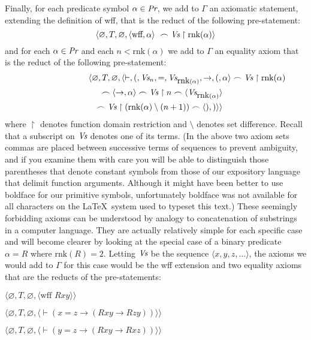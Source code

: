 Finally, for each predicate symbol $\alpha\in \mbox{\em Pr}$, we add to
$\Gamma$ an axiomatic statement, extending the definition of wff,
that is the reduct of the following pre-statement:
\begin{displaymath}
    \langle\varnothing,T,\varnothing,
            \langle \mbox{wff},\alpha\rangle\
            \frown \mbox{\em Vs}\restriction\mbox{rnk}(\alpha)\rangle
\end{displaymath}
and for each $\alpha\in \mbox{\em Pr}$ and each $n < \mbox{rnk}(\alpha)$
we add to $\Gamma$ an equality axiom that is the reduct of the
following pre-statement:
\begin{eqnarray*}
    \lefteqn{\langle\varnothing,T,\varnothing,
            \langle
      \vdash,(,\mbox{\em Vs}_n,=,\mbox{\em Vs}_{\mbox{rnk}(\alpha)},\to,
            (,\alpha\rangle\frown \mbox{\em Vs}\restriction\mbox{rnk}(\alpha)} \\
  & & \frown
            \langle\to,\alpha\rangle\frown \mbox{\em Vs}\restriction n\frown
            \langle \mbox{\em Vs}_{\mbox{rnk}(\alpha)}\rangle \\
 & & \frown
            \mbox{\em Vs}\restriction(\mbox{rnk}(\alpha)\setminus(n+1))\frown
            \langle),)\rangle\rangle
\end{eqnarray*}
where $\restriction$ denotes function domain restriction and $\setminus$
denotes set difference.  Recall that a subscript on $\mbox{\em Vs}$
denotes one of its terms.  (In the above two axiom sets commas are placed
between successive terms of sequences to prevent ambiguity, and if you examine
them with care you will be able to distinguish those parentheses that denote
constant symbols from those of our expository language that delimit function
arguments.  Although it might have been better to use boldface for our
primitive symbols, unfortunately boldface was not available for all characters
on the \LaTeX\ system used to typeset this text.)  These seemingly forbidding
axioms can be understood by analogy to concatenation of substrings in a
computer language.  They are actually relatively simple for each specific case
and will become clearer by looking at the special case of a binary predicate
$\alpha = R$ where $\mbox{rnk}(R)=2$.  Letting $\mbox{\em Vs}$ be the sequence
$\langle x,y,z,\ldots\rangle$, the axioms we would add to $\Gamma$ for this
case would be the wff extension and two equality axioms that are the
reducts of the pre-statements:
\begin{list}{}{\itemsep 0.0pt}
      \item[] $\langle\varnothing,T,\varnothing,
               \langle \mbox{wff\ }R x y\rangle\rangle$
      \item[] $\langle\varnothing,T,\varnothing,
               \langle \vdash(x=z
                  \to(R x y \to R z y))
               \rangle\rangle$
      \item[] $\langle\varnothing,T,\varnothing,
               \langle \vdash(y=z
                  \to(R x y \to R x z))
               \rangle\rangle$
\end{list}
